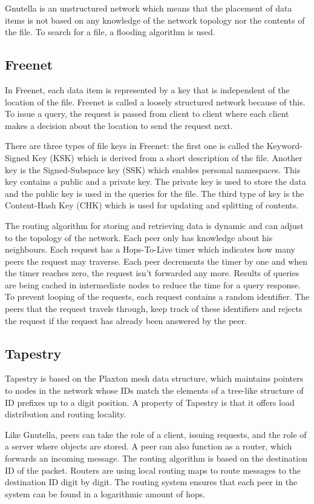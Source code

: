 \documentclass{article}
\begin{document}
		Gnutella is an unstructured network which means that the placement of data items is not based on any knowledge of the network topology nor the contents of the file. To search for a file, a flooding algorithm is used.
	
	\subsection{Freenet} %
		In Freenet, each data item is represented by a key that is independent of the location of the file. Freenet is called a loosely structured network because of this. To issue a query, the request is passed from client to client where each client makes a decision about the location to send the request next.
		
		There are three types of file keys in Freenet: the first one is called the Keyword-Signed Key (KSK) which is derived from a short description of the file. Another key is the Signed-Subspace key (SSK) which enables personal namespaces. This key contains a public and a private key. The private key is used to store the data and the public key is used in the queries for the file. The third type of key is the Content-Hash Key (CHK) which is used for updating and splitting of contents.
		
		The routing algorithm for storing and retrieving data is dynamic and can adjust to the topology of the network. Each peer only has knowledge about his neighbours. Each request has a Hops-To-Live timer which indicates how many peers the request may traverse. Each peer decrements the timer by one and when the timer reaches zero, the request isn't forwarded any more. Results of queries are being cached in intermediate nodes to reduce the time for a query response. To prevent looping of the requests, each request contains a random identifier. The peers that the request travels through, keep track of these identifiers and rejects the request if the request has already been answered by the peer.
		
	\subsection{Tapestry} %
		Tapestry is based on the Plaxton mesh data structure, which maintains pointers to nodes in the network whose IDs match the elements of a tree-like structure of ID prefixes up to a digit position. A property of Tapestry is that it offers load distribution and routing locality.
		
		Like Gnutella, peers can take the role of a client, issuing requests, and the role of a server where objects are stored. A peer can also function as a router, which forwards an incoming message. The routing algorithm is based on the destination ID of the packet. Routers are using local routing maps to route messages to the destination ID digit by digit. The routing system ensures that each peer in the system can be found in a logarithmic amount of hops.
		
\end{document}
